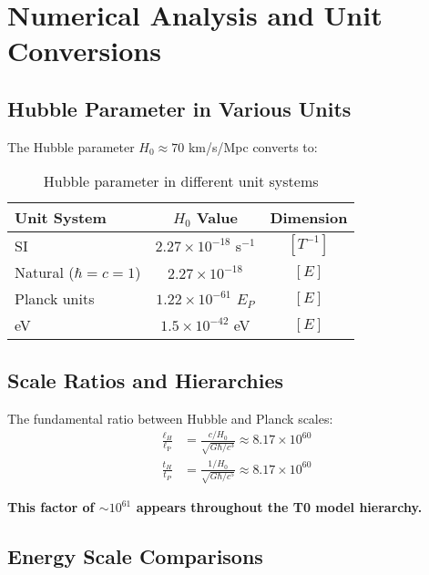\documentclass[12pt,a4paper]{article}
\newcommand{\lP}{\ell_{\text{P}}}
\begin{document}
	\section{Numerical Analysis and Unit Conversions}
	\label{sec:numerical_analysis}
	
	\subsection{Hubble Parameter in Various Units}
	\label{subsec:hubble_units}
	
	The Hubble parameter $H_0 \approx 70$ km/s/Mpc converts to:
	
	\begin{table}[htbp]
		\centering
		\begin{tabular}{lcc}
			\toprule
			\textbf{Unit System} & \textbf{$H_0$ Value} & \textbf{Dimension} \\
			\midrule
			SI & $2.27 \times 10^{-18}$ s$^{-1}$ & $[T^{-1}]$ \\
			Natural ($\hbar = c = 1$) & $2.27 \times 10^{-18}$ & $[E]$ \\
			Planck units & $1.22 \times 10^{-61}$ $E_P$ & $[E]$ \\
			eV & $1.5 \times 10^{-42}$ eV & $[E]$ \\
			\bottomrule
		\end{tabular}
		\caption{Hubble parameter in different unit systems}
		\label{tab:hubble_units}
	\end{table}
	
	\subsection{Scale Ratios and Hierarchies}
	\label{subsec:scale_ratios}
	
	The fundamental ratio between Hubble and Planck scales:
	\begin{align}
		\frac{\ell_H}{\lP} &= \frac{c/H_0}{\sqrt{G\hbar/c^3}} \approx 8.17 \times 10^{60} \\
		\frac{t_H}{t_P} &= \frac{1/H_0}{\sqrt{G\hbar/c^5}} \approx 8.17 \times 10^{60}
	\end{align}
	
	\textbf{This factor of $\sim 10^{61}$ appears throughout the T0 model hierarchy.}
	
	\subsection{Energy Scale Comparisons}
	\label{subsec:energy_comparisons}
	
\end{document}
